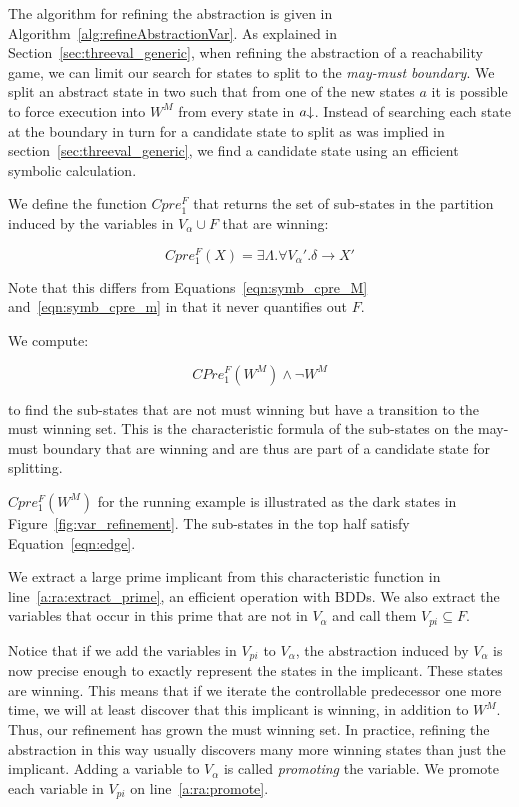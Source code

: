 The algorithm for refining the abstraction is given in Algorithm~\ref{alg:refineAbstractionVar}. As explained in Section~\ref{sec:threeval_generic}, when refining the abstraction of a reachability game, we can limit our search for states to split to the \emph{may-must boundary}. We split an abstract state in two such that from one of the new states $a$ it is possible to force execution into $W^M$ from every state in $a\mathord{\downarrow}$. Instead of searching each state at the boundary in turn for a candidate state to split as was implied in section~\ref{sec:threeval_generic}, we find a candidate state using an efficient symbolic calculation.

We define the function $Cpre_1^F$ that returns the set of sub-states in the partition induced by the variables in $V_{\alpha} \cup F$ that are winning:

\begin{equation}
    Cpre_1^F(X) = \exists \Lambda. \forall V_\alpha'. \delta \rightarrow X'
\end{equation}

Note that this differs from Equations~\ref{eqn:symb_cpre_M} and~\ref{eqn:symb_cpre_m} in that it never quantifies out $F$. 

We compute:

\begin{equation}
    CPre_1^F(W^M) \wedge \neg W^M
    \label{eqn:edge}
\end{equation}

\noindent to find the sub-states that are not must winning but have a transition to the must winning set. This is the characteristic formula of the sub-states on the may-must boundary that are winning and are thus are part of a candidate state for splitting.

$Cpre_1^F(W^M)$ for the running example is illustrated as the dark states in Figure~\ref{fig:var_refinement}. The sub-states in the top half satisfy Equation~\ref{eqn:edge}.

We extract a large prime implicant from this characteristic function in line~\ref{a:ra:extract_prime}, an efficient operation with BDDs. We also extract the variables that occur in this prime that are not in $V_\alpha$ and call them $V_{pi} \subseteq F$. 

Notice that if we add the variables in $V_{pi}$ to $V_\alpha$, the abstraction induced by $V_\alpha$ is now precise enough to exactly represent the states in the implicant. These states are winning. This means that if we iterate the controllable predecessor one more time, we will at least discover that this implicant is winning, in addition to $W^M$. Thus, our refinement has grown the must winning set. In practice, refining the abstraction in this way usually discovers many more winning states than just the implicant. Adding a variable to $V_\alpha$ is called \emph{promoting} the variable. We promote each variable in $V_{pi}$ on line~\ref{a:ra:promote}.


